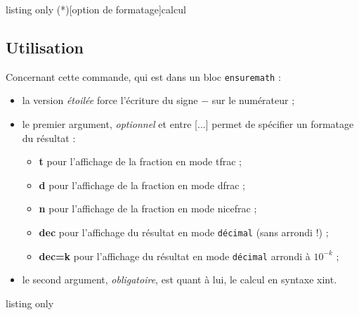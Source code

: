 \documentclass[french,a4paper,11pt]{article}
\newcommand\Cle[1]{{\bfseries\sffamily\textlangle #1\textrangle}}
\newcommand\cmaj[1]{\tcbox[vignetteMaJ]{#1}\xspace}
\begin{document}
\begin{PresentationCode}{listing only}
\ConvVersFrac(*)[option de formatage]{calcul}
\end{PresentationCode}

\subsection{Utilisation}

\begin{tipblock}
Concernant cette commande, qui est dans un bloc \texttt{ensuremath} :

\begin{itemize}
	\item \cmaj{0.1.3} la version \textit{étoilée} force l'écriture du signe \og $-$ \fg{} sur le numérateur ;
	\item le premier argument, \textit{optionnel} et entre \textsf{[...]} permet de spécifier un formatage du résultat :
	\begin{itemize}
		\item \Cle{t} pour l'affichage de la fraction en mode \textsf{tfrac} ;
		\item \Cle{d} pour l'affichage de la fraction en mode \textsf{dfrac} ;
		\item \Cle{n} pour l'affichage de la fraction en mode \textsf{nicefrac} ;
		\item \Cle{dec} pour l'affichage du résultat en mode \texttt{décimal} (sans arrondi !) ;
		\item \Cle{dec=k} pour l'affichage du résultat en mode \texttt{décimal} arrondi à $10^{-k}$ ;
	\end{itemize}
	\item le second argument, \textit{obligatoire}, est quant à lui, le calcul en syntaxe \textsf{xint}.
\end{itemize}
\vspace*{-\baselineskip}\leavevmode
\end{tipblock}

\begin{PresentationCode}{listing only}
\end{PresentationCode}
\end{document}
